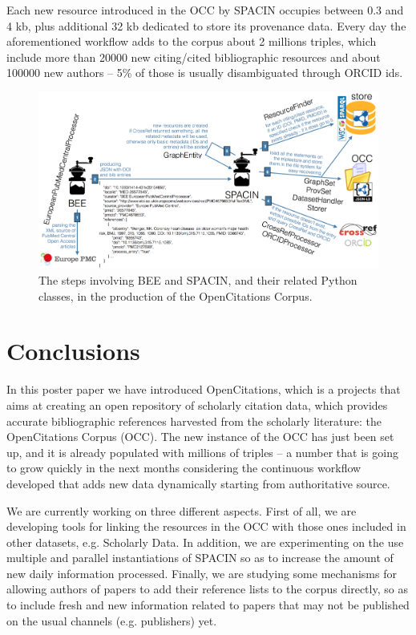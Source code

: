 \documentclass[runningheads,a4paper]{llncs}
\makeatletter
\def\maxwidth#1{\ifdim\Gin@nat@width>#1 #1\else\Gin@nat@width\fi}
\makeatother
\begin{document}
Each new resource introduced in the OCC by SPACIN occupies between 0.3 and 4 kb, plus additional 32 kb dedicated to store its provenance data. Every day the aforementioned workflow adds to the corpus about 2 millions triples, which include more than 20000 new citing/cited bibliographic resources and about 100000 new authors -- 5\% of those is usually disambiguated through ORCID ids.
\begin{figure}[h!]
\centering
\includegraphics[width=\maxwidth{\textwidth}]{img/1000020100000956000004DA5D885411.png}
\cprotect\caption{The steps involving BEE and SPACIN, and their related Python classes, in the production of the OpenCitations Corpus.}
\label{refIllustration0}
\end{figure}


\section{Conclusions}

In this poster paper we have introduced OpenCitations, which is a projects that aims at creating an open repository of scholarly citation data, which provides accurate bibliographic references harvested from the scholarly literature: the OpenCitations Corpus (OCC). The new instance of the OCC has just been set up, and it is already populated with millions of triples -- a number that is going to grow quickly in the next months considering the continuous workflow developed that adds new data dynamically starting from authoritative source.

We are currently working on three different aspects. First of all, we are developing tools for linking the resources in the OCC with those ones included in other datasets, e.g. Scholarly Data. In addition, we are experimenting on the use multiple and parallel instantiations of SPACIN so as to increase the amount of new daily information processed. Finally, we are studying some mechanisms for allowing authors of papers to add their reference lists to the corpus directly, so as to include fresh and new information related to papers that may not be published on the usual channels (e.g. publishers) yet.
\end{document}
